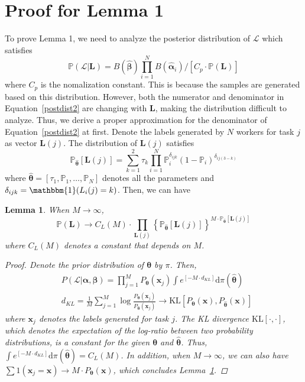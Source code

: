\documentclass{article}
\newtheorem{lemma}[theorem]{Lemma}
\begin{document}
\section{Proof for Lemma 1}
To prove Lemma 1, we need to analyze the posterior distribution of $\mathcal{L}$ which satisfies
\begin{equation}
\label{postdist2}
\mathbb P(\mathcal{L}|\bm{L})=B(\hat{\bm{\beta}}){\prod}_{i=1}^{N}B(\hat{\bm{\alpha}}_{i})/[C_p\cdot \mathbb P(\bm{L})]
\end{equation}
where $C_p$ is the nomalization constant.
This is because the samples are generated based on this distribution.
However, both the numerator and denominator in Equation~\ref{postdist2} are changing with $\bm{L}$, making the distribution difficult to analyze.
Thus, we derive a proper approximation for the denominator of Equation~\ref{postdist2} at first.
Denote the labels generated by $N$ workers for task $j$ as vector $\bm{L}(j)$.
The distribution of $\bm{L}(j)$ satisfies
\begin{equation}
\mathbb{P}_{\hat{\bm{\theta}}}[\bm{L}(j)] = {\sum}_{k=1}^{2}\tau_k{\prod}_{i=1}^{N}\mathbb{P}_i^{\delta_{ijk}}(1-\mathbb{P}_i)^{\delta_{ij(3-k)}}
\end{equation}
where $\hat{\bm{\theta}}=[\tau_1, \mathbb{P}_1,\ldots,\mathbb{P}_N]$ denotes all the parameters and $\delta_{ijk}=\mathbbm{1}(L_i(j)=k)$.
Then, we can have
\begin{lemma}
\label{Denominator}
When $M\rightarrow \infty$, 
\begin{equation*}
\mathbb{P}(\bm{L})\rightarrow C_{L}(M) \cdot {\prod}_{\bm{L}(j)} \left\{\mathbb{P}_{\hat{\bm{\theta}}}[\bm{L}(j)]\right\}^{M\cdot \mathbb{P}_{\hat{\bm{\theta}}}[\bm{L}(j)]}
\end{equation*}
where $C_{L}(M)$ denotes a constant that depends on $M$.
\begin{proof}
Denote the prior distribution of $\bm{\theta}$ by $\pi$. Then,
\begin{align}
&P(\mathcal{L}|\bm{\alpha}, \bm{\beta})= {\prod}_{j=1}^{M}P_{\bm{\theta}}(\bm{x}_j) \int e^{[-M\cdot d_{KL}]} \mathrm{d}\pi(\hat{\bm{\theta}})\\
&d_{KL}=\frac{1}{M}\sum_{j=1}^{M}\log \frac{P_{\bm{\theta}}(\bm{x}_j)}{P_{\bm{\hat{\theta}}}(\bm{x}_j)}\rightarrow \mathrm{KL}[P_{\bm{\theta}}(\bm{x}),P_{\bm{\hat{\theta}}}(\bm{x})]
\end{align}
where $\bm{x}_j$ denotes the labels generated for task $j$. The KL divergence $\mathrm{KL}[\cdot, \cdot]$, which denotes the expectation of the log-ratio between two probability distributions, is a constant for the given $\bm{\theta}$ and $\hat{\bm{\theta}}$.
Thus, $\int e^{[-M\cdot d_{KL}]} \mathrm{d}\pi(\hat{\bm{\theta}})=C_{L}(M)$.
In addition, when $M\rightarrow \infty$, we can also have $\sum 1(\bm{x}_j=\bm{x})\rightarrow M \cdot P_{\bm{\theta}}(\bm{x})$, which concludes Lemma~\ref{Denominator}.
\end{proof}
\end{lemma}
\end{document}
